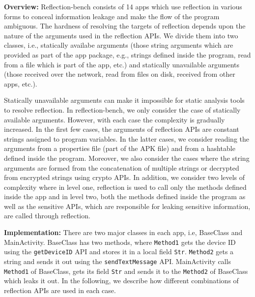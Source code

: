 \textbf{Overview:} Reflection-bench consists of 14 apps which use reflection in various forms to conceal information leakage and make the flow of the program ambiguous. %
The hardness of resolving the targets of reflection depends upon the nature of the arguments used in the reflection APIs. We divide them into two classes,  i.e., statically availabe arguments (those string arguments which are provided as part of the app package, e.g., strings defined inside the program, read from a file which is part of the app, etc.) and statically unavailable arguments (those received over the network, read from files on disk, received from other apps, etc.).

Statically unavailable arguments can make it impossible for static analysis tools to resolve reflection. In reflection-bench, we only consider the case of statically available arguments. However, with each case the complexity is gradually increased. In the first few cases, the arguments of reflection APIs are constant strings assigned to program variables. In the latter cases, we consider reading the arguments from a properties file (part of the APK file) and from a hashtable defined inside the program. Moreover, we also consider the cases where the string arguments are formed from the concatenation of multiple strings or decrypted from encrypted strings using crypto APIs. In addition, we consider two levels of complexity where in level one, reflection is used to call only the methods defined inside the app and in level two, both the methods defined inside the program as well as the sensitive APIs, which are responsible for leaking sensitive information, are called through reflection.

\textbf{Implementation:} There are two major classes in each app, i.e, BaseClass and MainActivity. BaseClass has two methods, where \texttt{Method1} gets the device ID using the \texttt{getDeviceID} API and stores it in a local field \texttt{Str}. \texttt{Method2} gets a string and sends it out using the \texttt{sendTextMessage} API. MainActivity calls \texttt{Method1} of BaseClass, gets its field \texttt{Str} and sends it to the \texttt{Method2} of BaseClass which leaks it out. In the following, we describe how different combinations of reflection APIs are used in each case.

